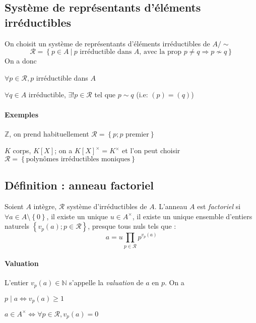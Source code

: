 \documentclass[reqno,a4paper,10pt]{report}
\makeatletter
\newcommand{\set}[1]{\left\lbrace #1 \right\rbrace} %
\newcommand{\IZ}{\ensuremath{\mathbb{Z}}\xspace} %
\newcommand{\IN}{\ensuremath{\mathbb{N}}\xspace} %
\newcommand{\so}{\Rightarrow}
\newcommand{\Such}{\ \Big| \ }
\let\olditemize=\itemize%
\renewenvironment{itemize}{%
    \olditemize%
  }{%
    \@noparlisttrue%
    \endlist%
  }%
\makeatother
\begin{document}
\subsection{Système de représentants d'éléments irréductibles}
On choisit un système de représentants d'éléments irréductibles de $A/\sim$
\[\mathcal R = \set{p \in A \Such p \text{ irréductible dans }A
\text{, avec la prop } p\neq q \so p\nsim q}\]
On a donc
\begin{itemize}
  \item $\forall p \in \mathcal R, p$ irréductible dans $A$
  \item $\forall q \in A$ irréductible, $\exists ! p \in \mathcal R$ tel que
    $p\sim q$ (i.e: $(p)=(q)$)
\end{itemize}

\paragraph{Exemples}
\begin{itemize}
  \item $\IZ$, on prend habituellement $\mathcal R=\set{p; p\text{ premier}}$
  \item $K$ corps, $K[X]$; on a $K[X]^\times=K^\times$ et l'on peut choisir
    $\mathcal R=\set{\text{polynômes irréductibles moniques}}$
\end{itemize}

\subsection{Définition : anneau factoriel}
Soient $A$ intègre, $\mathcal R$ système d'irréductibles de $A$. L'anneau $A$
est \emph{factoriel} si\\
$\forall a \in A\setminus\set{0}$, il existe un unique $u\in A^\times$, il
existe un unique ensemble d'entiers naturels $\set{v_p(a); p\in \mathcal R}$,
presque tous nuls tels que :
\[a = u \prod_{p\in \mathcal R} p^{v_p(a)}\]

\paragraph{Valuation}
L'entier $v_p(a)\in \IN$ s'appelle la \emph{valuation} de $a$ en $p$. On a
\begin{itemize}
  \item $p\mid a \iff v_p(a)\geq 1$
  \item $a\in A^\times \iff \forall p \in \mathcal R, v_p(a)=0$
\end{itemize}
\end{document}
